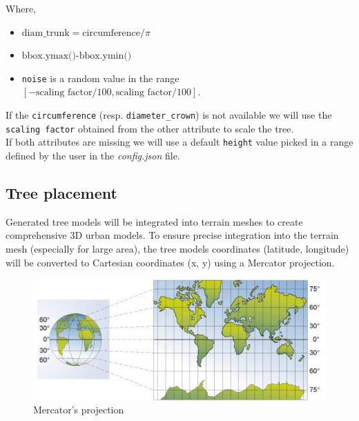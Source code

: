 \documentclass[12pt]{article}
\begin{document}
Where,
\begin{itemize}
    \item $\text{diam\_trunk} = \text{circumference} / \pi$
    \item $\text{bbox.ymax()-bbox.ymin()}$
    \item \texttt{noise} is a random value in the range 
    $[-\text{scaling factor} / 100, \text{scaling factor} / 100]$.
\end{itemize}

If the \texttt{circumference} (resp. \texttt{diameter\_crown}) is not available
we will use the \texttt{scaling factor} obtained from the other attribute to 
scale the tree.\\
If both attributes are missing we will use a default \texttt{height} value 
picked in a range defined by the user in the \textit{config.json} file.

\subsection{Tree placement}

Generated tree models will be integrated into terrain meshes to create comprehensive
3D urban models. To ensure precise integration into the terrain mesh (especially for large area), the tree models coordinates
(latitude, longitude) will be converted to Cartesian coordinates (x, y) using
a Mercator projection\cite{mercator-proj}.

\begin{figure}[H]
    \centering
    \includegraphics[width=1\textwidth]{images/mercator.jpg}
    \caption{Mercator's projection\cite{img:mercator}}
\end{figure}
\end{document}
